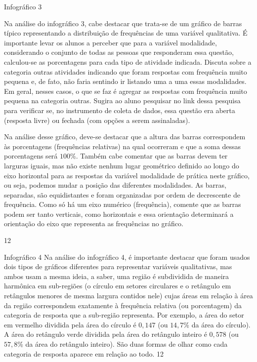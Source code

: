 \begin{sugestions}{Infográfico 3}
{
Na análise do infográfico 3, cabe destacar que trata-se de um gráfico de barras típico representando a distribuição de frequências de uma variável qualitativa. É importante levar os alunos a perceber que para a variável modalidade, considerando o conjunto de todas as pessoas que responderam essa questão, calculou-se as porcentagens para cada tipo de atividade indicada. Discuta sobre a categoria outras atividades indicando que foram respostas com frequência muito pequena e, de fato, não faria sentindo ir listando uma a uma essas modalidades. Em geral, nesses casos, o que se faz é agregar as respostas com frequência muito pequena na categoria outras. Sugira ao aluno pesquisar no link dessa pesquisa para verificar se, no instrumento de coleta de dados, essa questão era aberta (resposta livre) ou fechada (com opções a serem assinaladas).

Na análise desse gráfico, deve-se destacar que a altura das barras correspondem às porcentagens (frequências relativas) na qual ocorreram e que a soma dessas porcentagens será $100$\%. Também cabe comentar que as barras devem ter larguras iguais, mas não existe nenhum lugar geométrico definido ao longo do eixo horizontal para as respostas da variável modalidade de prática neste gráfico, ou seja, podemos mudar a posição das diferentes modalidades. As barras, separadas, são equidistantes e foram organizadas por ordem de decrescente de frequência. Como só há um eixo numérico (frequência), comente que as barras podem ser tanto verticais, como horizontais e essa orientação determinará a orientação do eixo que representa as frequências no gráfico.
}{1}{2}
\end{sugestions}
\begin{sugestions}{Infográfico 4}
{
Na análise do infográfico 4, é importante destacar que foram usados dois tipos de gráficos diferentes para representar variáveis qualitativas, mas ambos usam a mesma ideia, a saber, uma região é subdividida de maneira harmônica em sub-regiões (o círculo em setores circulares e o retângulo em retângulos menores de mesma largura contidos nele) cujas áreas em relação à área da região correspondem exatamente à frequência relativa (ou porcentagem) da categoria de resposta que a sub-região representa. Por exemplo, a área do setor em vermelho dividida pela área do círculo é $0{,}147$ (ou $14{,}7$\% da área do círculo). A área do retângulo verde dividida pela área do retângulo inteiro é $0{,}578$ (ou $57{,}8$\% da área do retângulo inteiro). São duas formas de olhar como cada categoria de resposta aparece em relação ao todo.
}{1}{2}
\end{sugestions}

